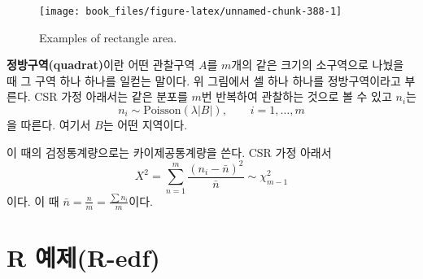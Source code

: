 \documentclass[b5paper,]{scrbook}
\theoremstyle{plain}
\theoremstyle{definition}
\numberwithin{equation}{section}
\begin{document}
\begin{figure}

{\centering \texttt{[image: book\_files/figure-latex/unnamed-chunk-388-1]} 

}

\caption{Examples of rectangle area.}\label{fig:unnamed-chunk-388}
\end{figure}

\textbf{정방구역(quadrat)}이란 어떤 관찰구역 \(A\)를 \(m\)개의 같은 크기의 소구역으로 나눴을 때 그 구역 하나 하나를 일컫는 말이다. 위 그림에서 셀 하나 하나를 정방구역이라고 부른다. CSR 가정 아래서는 같은 분포를 \(m\)번 반복하여 관찰하는 것으로 볼 수 있고 \(n_{i}\)는
\[n_{i} \sim \text{Poisson}(\lambda |B|),\qquad{i=1,\ldots, m}\]
을 따른다. 여기서 \(B\)는 어떤 지역이다.

이 때의 검정통계량으로는 카이제공통계량을 쓴다. CSR 가정 아래서
\[X^{2}=\sum_{n=1}^{m}\frac{(n_{i}-\bar{n})^{2}}{\bar{n}} \sim \chi_{m-1}^{2}\]
이다. 이 때 \(\bar{n}=\frac{n}{m}=\frac{\sum n_{i}}{m}\)이다.

\hypertarget{r-r-edf}{%
\section{R 예제(R-edf)}\label{r-r-edf}}
\end{document}
